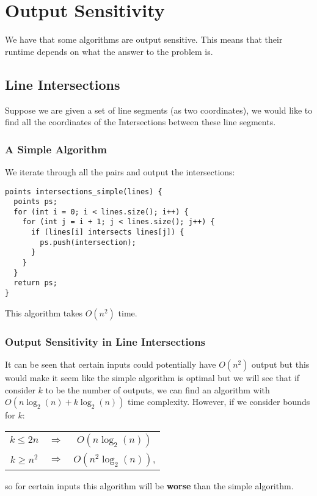 \section{Output Sensitivity}

We have that some algorithms are output sensitive. This means that their
runtime depends on what the answer to the problem is.

\subsection{Line Intersections}

Suppose we are given a set of line segments (as two coordinates), we would
like to find all the coordinates of the Intersections between these line
segments.

\subsubsection{A Simple Algorithm}

We iterate through all the pairs and output the intersections:
\begin{lstlisting}
points intersections_simple(lines) {
  points ps;
  for (int i = 0; i < lines.size(); i++) {
    for (int j = i + 1; j < lines.size(); j++) {
      if (lines[i] intersects lines[j]) {
        ps.push(intersection);
      }
    }    
  }
  return ps;
}
\end{lstlisting} This algorithm takes $O(n^2)$ time.

\subsubsection{Output Sensitivity in Line Intersections}

It can be seen that certain inputs could potentially have $O(n^2)$ output
but this would make it seem like the simple algorithm is optimal but we
will see that if consider $k$ to be the number of outputs, we can find
an algorithm with $O(n\log_2(n) + k\log_2(n))$ time complexity. However,
if we consider bounds for $k$:
\begin{center}
  \begin{tabular}{ c c c }
    $k \leq 2n$  & $\Rightarrow$ & $O(n\log_2(n))$ \\
    $k \geq n^2$ & $\Rightarrow$ & $O(n^2\log_2(n))$,
  \end{tabular}
\end{center} so for certain inputs this algorithm will be \textbf{worse}
than the simple algorithm.

